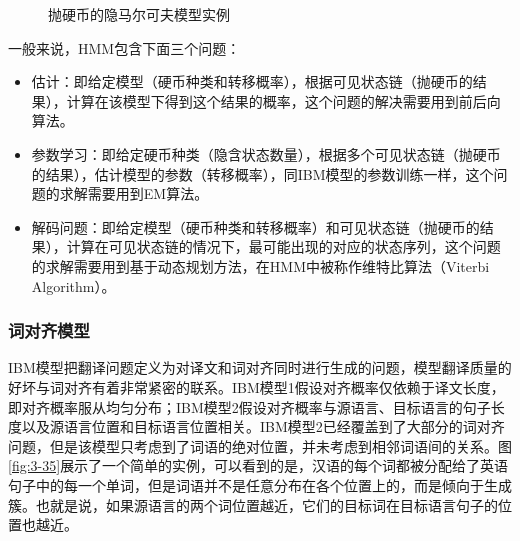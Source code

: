 \begin{figure}[htp]
    \centering

    \caption{抛硬币的隐马尔可夫模型实例}
    \label{fig:3-34}
\end{figure}

\parinterval 一般来说，HMM包含下面三个问题\cite{manning1999foundations}：

\begin{itemize}
\vspace{0.5em}
\item 估计：即给定模型（硬币种类和转移概率），根据可见状态链（抛硬币的结果），计算在该模型下得到这个结果的概率，这个问题的解决需要用到前后向算法。
\vspace{0.5em}
\item 参数学习：即给定硬币种类（隐含状态数量），根据多个可见状态链（抛硬币的结果），估计模型的参数（转移概率），同IBM模型的参数训练一样，这个问题的求解需要用到EM算法。
\vspace{0.5em}
\item 解码问题：即给定模型（硬币种类和转移概率）和可见状态链（抛硬币的结果），计算在可见状态链的情况下，最可能出现的对应的状态序列，这个问题的求解需要用到基于动态规划方法，在HMM中被称作维特比算法（Viterbi Algorithm）。
\vspace{0.5em}
\end{itemize}

\vspace{-2em}
\subsubsection{词对齐模型}

\parinterval IBM模型把翻译问题定义为对译文和词对齐同时进行生成的问题，模型翻译质量的好坏与词对齐有着非常紧密的联系。IBM模型1假设对齐概率仅依赖于译文长度，即对齐概率服从均匀分布；IBM模型2假设对齐概率与源语言、目标语言的句子长度以及源语言位置和目标语言位置相关。IBM模型2已经覆盖到了大部分的词对齐问题，但是该模型只考虑到了词语的绝对位置，并未考虑到相邻词语间的关系。图\ref{fig:3-35}展示了一个简单的实例，可以看到的是，汉语的每个词都被分配给了英语句子中的每一个单词，但是词语并不是任意分布在各个位置上的，而是倾向于生成簇。也就是说，如果源语言的两个词位置越近，它们的目标词在目标语言句子的位置也越近。

